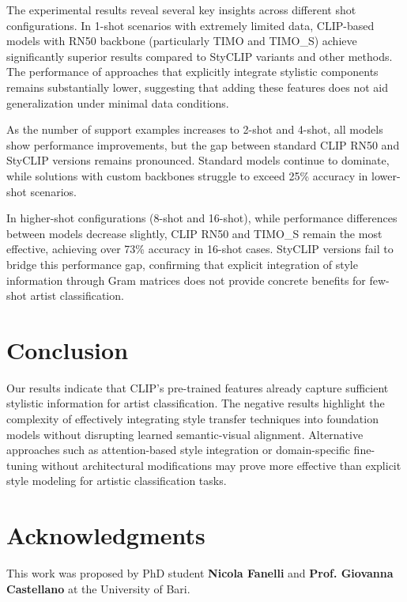 \documentclass[conference,6pt]{IEEEtran}
\begin{document}
The experimental results reveal several key insights across different shot configurations. In 1-shot scenarios with extremely limited data, CLIP-based models with RN50 backbone (particularly TIMO and TIMO\_S) achieve significantly superior results compared to StyCLIP variants and other methods. The performance of approaches that explicitly integrate stylistic components remains substantially lower, suggesting that adding these features does not aid generalization under minimal data conditions.
\clearpage

As the number of support examples increases to 2-shot and 4-shot, all models show performance improvements, but the gap between standard CLIP RN50 and StyCLIP versions remains pronounced. Standard models continue to dominate, while solutions with custom backbones struggle to exceed 25\% accuracy in lower-shot scenarios.

In higher-shot configurations (8-shot and 16-shot), while performance differences between models decrease slightly, CLIP RN50 and TIMO\_S remain the most effective, achieving over 73\% accuracy in 16-shot cases. StyCLIP versions fail to bridge this performance gap, confirming that explicit integration of style information through Gram matrices does not provide concrete benefits for few-shot artist classification.



\section{Conclusion}

Our results indicate that CLIP's pre-trained features already capture sufficient stylistic information for artist classification. The negative results highlight the complexity of effectively integrating style transfer techniques into foundation models without disrupting learned semantic-visual alignment.
Alternative approaches such as attention-based style integration or domain-specific fine-tuning without architectural modifications may prove more effective than explicit style modeling for artistic classification tasks.




\section{Acknowledgments}
This work was proposed by PhD student \textbf{Nicola Fanelli} and \textbf{Prof. Giovanna Castellano} at the University of Bari. 


\end{document}
